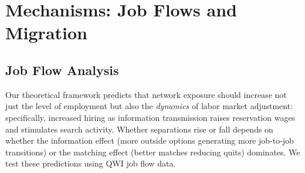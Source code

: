 \documentclass[12pt]{article}
\begin{document}
\section{Mechanisms: Job Flows and Migration}
\label{sec:mechanisms}

\subsection{Job Flow Analysis}

Our theoretical framework predicts that network exposure should increase not just the level of employment but also the \textit{dynamics} of labor market adjustment: specifically, increased hiring as information transmission raises reservation wages and stimulates search activity. Whether separations rise or fall depends on whether the information effect (more outside options generating more job-to-job transitions) or the matching effect (better matches reducing quits) dominates. We test these predictions using QWI job flow data.
\end{document}
